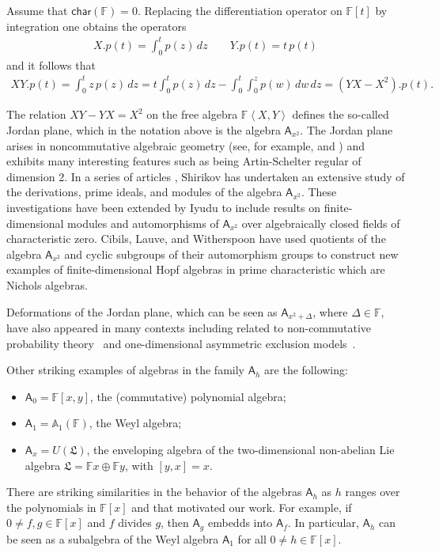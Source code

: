 \documentclass{commat}
\newcommand\q{\quad}
\newcommand{\FF}{\mathbb{F}}
\newcommand{\wa}[1][1]{\mathbb{A}_{#1}}
\newcommand{\A}{\mathsf{A}}
\newcommand\chara{\mathsf {char}}
\newcommand{\ip}[1]{\left\langle #1\right\rangle}
\begin{document}
\begin{example}
	Assume that $\chara(\FF)=0$. Replacing the differentiation operator on $\FF[t]$ by integration one obtains the operators 
	\begin{align*}
		X.p(t)=\int_{0}^{t}p(z)\, dz \q\q Y.p(t)=t\, p(t)
	\end{align*}
	and it follows that
	\begin{align*}
		XY.p(t)=\int_{0}^{t}z\,p(z)\, dz =t\int_{0}^{t}p(z)\, dz - \int_{0}^{t}\int_{0}^{z}p(w)\, dw\, dz=(YX-X^{2}).p(t).
	\end{align*}
\end{example}
The relation $XY-YX=X^2$ on the free algebra $\FF\ip{X,Y}$ defines the so-called Jordan plane, which in the notation above is the algebra $\A_{x^2}$. The Jordan plane arises in noncommutative algebraic geometry (see, for example, \cite{SZ94} and \cite{AS95})  and
exhibits many interesting features such as being Artin-Schelter regular of dimension 2. 
In a series of articles \cite{eS05, eS07, eS07b},  Shirikov
has undertaken an extensive study of the derivations, prime ideals, and modules
of the algebra $\A_{x^2}$.  These investigations have been extended by Iyudu \cite{nI14} to include results on finite-dimensional modules and automorphisms of
$\A_{x^2}$ over algebraically closed fields of characteristic zero.  Cibils, Lauve, and Witherspoon \cite{CLW09}  have used quotients of the algebra $\A_{x^2}$ 
and cyclic subgroups of their automorphism groups to
construct new examples of finite-dimensional Hopf algebras in prime characteristic
which are Nichols algebras.

Deformations of the Jordan plane, which can be seen as $\A_{x^2+\Delta}$, where $\Delta\in\FF$, have also appeared in many contexts including related to non-commutative probability theory~\cite{BKS97} and one-dimensional asymmetric exclusion models~\cite{DEHP93}.


Other striking examples of algebras in the family $\A_h$ are the following:
\begin{itemize}
	\item $\A_{0}=\FF[x, y]$, the (commutative) polynomial algebra;
	\item $\A_{1}=\wa(\FF)$, the Weyl algebra;
	\item $\A_{x}=U(\mathfrak{L})$, the enveloping algebra of the two-dimensional non-abelian Lie algebra 
	$\mathfrak{L}=\FF x\oplus\FF y$, with $[y, x]=x$.
\end{itemize}
There are striking similarities in the behavior of the algebras $\A_h$ as $h$ ranges over the polynomials
in $\FF[x]$ and that motivated our work. For example, if $0\neq f, g\in\FF[x]$ and $f$ divides $g$, then  $\A_g$ embedds into $\A_f$. In particular, $\A_h$ can be seen as a subalgebra of the Weyl algebra $\A_1$ for all $0\neq h\in\FF[x]$.
\end{document}
